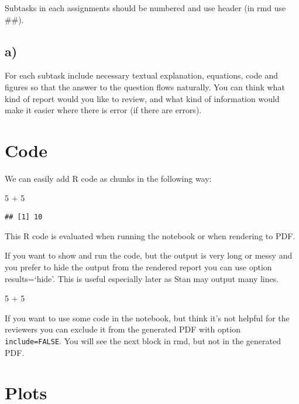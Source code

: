 \documentclass[
]{article}
\newenvironment{Shaded}{\begin{snugshade}}{\end{snugshade}}
\newcommand{\DecValTok}[1]{\textcolor[rgb]{0.00,0.00,0.81}{#1}}
\newcommand{\SpecialCharTok}[1]{\textcolor[rgb]{0.00,0.00,0.00}{#1}}
\begin{document}
Subtasks in each assignments should be numbered and use header (in rmd
use \#\#).

\hypertarget{a}{%
\subsection{a)}\label{a}}

For each subtask include necessary textual explanation, equations, code
and figures so that the answer to the question flows naturally. You can
think what kind of report would you like to review, and what kind of
information would make it easier where there is error (if there are
errors).

\hypertarget{code}{%
\section{Code}\label{code}}

We can easily add R code as chunks in the following way:

\begin{Shaded}
\begin{Highlighting}[]
\DecValTok{5} \SpecialCharTok{+} \DecValTok{5}
\end{Highlighting}
\end{Shaded}

\begin{verbatim}
## [1] 10
\end{verbatim}

This R code is evaluated when running the notebook or when rendering to
PDF.

If you want to show and run the code, but the output is very long or
messy and you prefer to hide the output from the rendered report you can
use option results=`hide'. This is useful especially later as Stan may
output many lines.

\begin{Shaded}
\begin{Highlighting}[]
\DecValTok{5} \SpecialCharTok{+} \DecValTok{5}
\end{Highlighting}
\end{Shaded}

If you want to use some code in the notebook, but think it's not helpful
for the reviewers you can exclude it from the generated PDF with option
\texttt{include=FALSE}. You will see the next block in rmd, but not in
the generated PDF.

\hypertarget{plots}{%
\section{Plots}\label{plots}}
\end{document}
